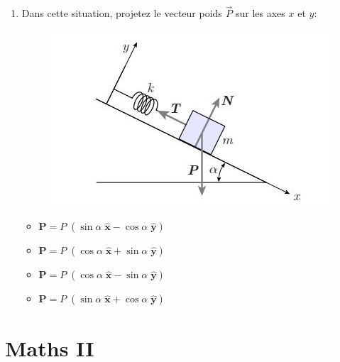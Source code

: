 \documentclass{article}
\begin{document}
\begin{enumerate}
    \item Dans cette situation, projetez le vecteur poids $\Vec{P}$ sur les axes $x$ et $y$:
    \begin{figure}[H]
        \centering
        \includegraphics[]{Images/projections_kahoot.JPG}
        \label{fig:proj_k}
    \end{figure}
    \begin{itemize}
        \item $\textbf{P} = P\;(\sin{\alpha} \; \hat{\textbf{x}} - \cos{\alpha} \; \hat{\textbf{y}})$ %
        \item $\textbf{P} = P\;(\cos{\alpha} \; \hat{\textbf{x}} + \sin{\alpha} \; \hat{\textbf{y}})$
        \item $\textbf{P} = P\;(\cos{\alpha} \; \hat{\textbf{x}} - \sin{\alpha} \; \hat{\textbf{y}})$
        \item $\textbf{P} = P\;(\sin{\alpha} \; \hat{\textbf{x}} + \cos{\alpha} \; \hat{\textbf{y}})$
    \end{itemize}
    
    


\end{enumerate}
\section{Maths II}
\end{document}
